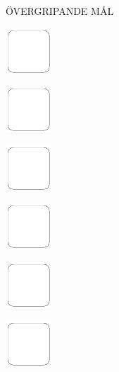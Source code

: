 \documentclass[11pt,titlepage]{article}
\begin{document}
\small %
\hfill ÖVERGRIPANDE MÅL

\vspace{6mm}

\noindent
\includegraphics[]{checkbox-10mm.pdf}

\vspace{14,7mm}

\noindent
\includegraphics[]{checkbox-10mm.pdf}

\vspace{14,7mm}

\noindent
\includegraphics[]{checkbox-10mm.pdf}

\vspace{14,7mm}

\noindent
\includegraphics[]{checkbox-10mm.pdf}

\vspace{14,7mm}

\noindent
\includegraphics[]{checkbox-10mm.pdf}

\vspace{14,7mm}

\noindent
\includegraphics[]{checkbox-10mm.pdf}

\pagebreak
\end{document}
